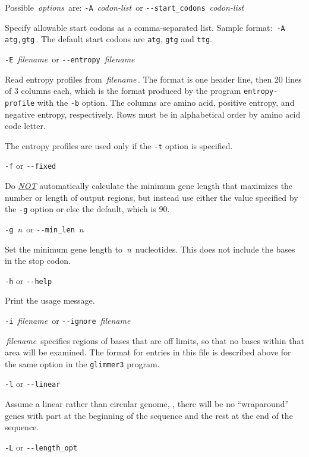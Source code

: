 \documentclass[fleqn,titlepage,11pt]{article}
\def\Desc#1{\,\mbox{\emph{#1}}\,}
\def\Pg#1{\texttt{#1}}
\begin{document}
Possible \Desc{options} are:
\bl{}\RaggedRight
\exdent
  \verb`-A` \Desc{codon-list} \enskip or \enskip \verb`--start_codons` \Desc{codon-list}

  Specify allowable start codons as a comma-separated list.
  Sample format:  \,\verb`-A atg,gtg`\,.
  The default start codons are \Pg{atg}, \Pg{gtg} and \Pg{ttg}.

\exdent
  \verb`-E` \Desc{filename} \enskip or \enskip \verb`--entropy` \Desc{filename}

  Read entropy profiles from \Desc{filename}.  The format is one header
  line, then 20 lines of 3 columns each, which is the format produced
  by the program \Pg{entropy-profile} with the \Pg{-b} option.
  The columns are amino acid,
  positive entropy, and negative entropy, respectively.  Rows must be in
  alphabetical order by amino acid code letter.

  The entropy profiles are used only if the \Pg{-t} option is specified.

\exdent
  \verb`-f` \enskip or \enskip \verb`--fixed`

  Do \underline{\emph{NOT}} automatically calculate the minimum gene
  length that maximizes the number or length of output regions, but
  instead use either the value specified by the \Pg{-g} option or
  else the default, which is 90.

\exdent
  \verb`-g` \Desc{n} \enskip or \enskip \verb`--min_len` \Desc{n}

  Set the minimum gene length to \Desc{n} nucleotides.  This does not include
  the bases in the stop codon.

\exdent
  \verb`-h` \enskip or \enskip \verb`--help`

  Print the usage message.

\exdent
  \verb`-i` \Desc{filename} \enskip or \enskip \verb`--ignore` \Desc{filename}

  \Desc{filename} specifies regions of bases that are off 
  limits, so that no bases within that area will be examined.
  The format for entries in this file is described above for
  the same option in the \Pg{glimmer3} program.

\exdent
  \verb`-l` \enskip or \enskip \verb`--linear`

  Assume a linear rather than circular genome, \ie, there will
  be no ``wraparound'' genes with part at the beginning of the sequence
  and the rest at the end of the sequence.

\exdent
  \verb`-L` \enskip or \enskip \verb`--length_opt`
\end{document}

